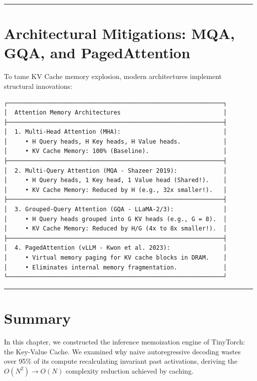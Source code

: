\documentclass[
  letterpaper,
]{scrbook}
\begin{document}
\begin{center}\rule{0.5\linewidth}{0.5pt}\end{center}

\section{Architectural Mitigations: MQA, GQA, and
PagedAttention}\label{architectural-mitigations-mqa-gqa-and-pagedattention}

To tame KV Cache memory explosion, modern architectures implement
structural innovations:

\begin{verbatim}
┌─────────────────────────────────────────────────────────────┐
│  Attention Memory Architectures                             │
├─────────────────────────────────────────────────────────────┤
│  1. Multi-Head Attention (MHA):                             │
│     • H Query heads, H Key heads, H Value heads.            │
│     • KV Cache Memory: 100% (Baseline).                     │
├─────────────────────────────────────────────────────────────┤
│  2. Multi-Query Attention (MQA - Shazeer 2019):             │
│     • H Query heads, 1 Key head, 1 Value head (Shared!).    │
│     • KV Cache Memory: Reduced by H (e.g., 32x smaller!).   │
├─────────────────────────────────────────────────────────────┤
│  3. Grouped-Query Attention (GQA - LLaMA-2/3):              │
│     • H Query heads grouped into G KV heads (e.g., G = 8).  │
│     • KV Cache Memory: Reduced by H/G (4x to 8x smaller!).  │
├─────────────────────────────────────────────────────────────┤
│  4. PagedAttention (vLLM - Kwon et al. 2023):               │
│     • Virtual memory paging for KV cache blocks in DRAM.    │
│     • Eliminates internal memory fragmentation.             │
└─────────────────────────────────────────────────────────────┘
\end{verbatim}

\begin{center}\rule{0.5\linewidth}{0.5pt}\end{center}

\section{Summary}\label{summary-18}

In this chapter, we constructed the inference memoization engine of
TinyTorch: the Key-Value Cache. We examined why naive autoregressive
decoding wastes over 95\% of its compute recalculating invariant past
activations, deriving the \(O(N^2) \to O(N)\) complexity reduction
achieved by caching.
\end{document}
